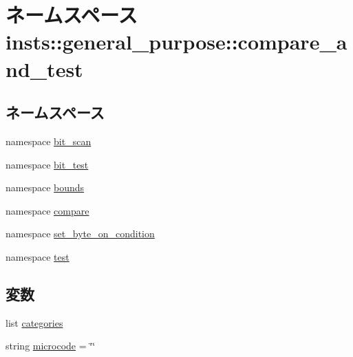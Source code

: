 \hypertarget{namespaceinsts_1_1general__purpose_1_1compare__and__test}{
\section{ネームスペース insts::general\_\-purpose::compare\_\-and\_\-test}
\label{namespaceinsts_1_1general__purpose_1_1compare__and__test}
}
\subsection*{ネームスペース}
\begin{DoxyCompactItemize}
\item 
namespace \hyperlink{namespaceinsts_1_1general__purpose_1_1compare__and__test_1_1bit__scan}{bit\_\-scan}
\item 
namespace \hyperlink{namespaceinsts_1_1general__purpose_1_1compare__and__test_1_1bit__test}{bit\_\-test}
\item 
namespace \hyperlink{namespaceinsts_1_1general__purpose_1_1compare__and__test_1_1bounds}{bounds}
\item 
namespace \hyperlink{namespaceinsts_1_1general__purpose_1_1compare__and__test_1_1compare}{compare}
\item 
namespace \hyperlink{namespaceinsts_1_1general__purpose_1_1compare__and__test_1_1set__byte__on__condition}{set\_\-byte\_\-on\_\-condition}
\item 
namespace \hyperlink{namespaceinsts_1_1general__purpose_1_1compare__and__test_1_1test}{test}
\end{DoxyCompactItemize}
\subsection*{変数}
\begin{DoxyCompactItemize}
\item 
list \hyperlink{namespaceinsts_1_1general__purpose_1_1compare__and__test_a273cf0f1630af14c1582f05e53354a55}{categories}
\item 
string \hyperlink{namespaceinsts_1_1general__purpose_1_1compare__and__test_a770f11a173e99389a8802f0107ed8f52}{microcode} = \char`\"{}\char`\"{}
\end{DoxyCompactItemize}


